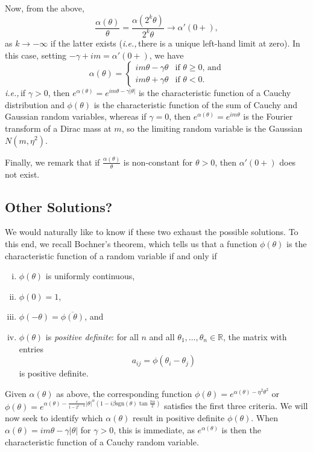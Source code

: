 \documentclass[11pt]{amsart}
\theoremstyle{remark}
\theoremstyle{definition}
\newcommand{\ie}{\textit{i.e.,}\,}
\begin{document}
Now, from the above, 
\[
	\frac{\alpha(\theta)}{\theta} = \frac{\alpha(2^{k} \theta)}{2^{k}\theta} \to \alpha'(0+),
\]
as $k \to - \infty$ if the latter exists (\ie there is a unique left-hand limit at zero).  In this case, setting $-\gamma + i m = \alpha'(0+)$, we have
\[
	\alpha(\theta) = \begin{cases} 
		i m\theta - \gamma \theta & \text{if $\theta \geq 0$, and}\\
		i m\theta + \gamma \theta & \text{if $\theta < 0$}.
	\end{cases}
\]
\ie if $\gamma > 0$, then $e^{\alpha(\theta)} = e^{im \theta -\gamma|\theta|}$ is the characteristic function of a Cauchy distribution and $\phi(\theta)$ is the characteristic function of the sum of Cauchy and Gaussian random variables, whereas if $\gamma = 0$, then $e^{\alpha(\theta)} = e^{im \theta}$ is the Fourier transform of a Dirac mass at $m$, so the limiting random variable is the Gaussian $N(m,\eta^{2})$. 

Finally, we remark that if $\frac{\alpha(\theta)}{\theta}$ is non-constant for $\theta > 0$, then $\alpha'(0+)$ does not exist. 

\subsection{Other Solutions?}

We would naturally like to know if these two exhaust the possible solutions.  To this end, we recall Bochner's theorem, which tells us that a function $\phi(\theta)$ is the characteristic function of a random variable if and only if
\begin{enumerate}[(i)]
\item $\phi(\theta)$ is uniformly continuous,
\item $\phi(0) = 1$,
\item $\phi(-\theta) = \overline{\phi(\theta)}$, and
\item $\phi(\theta)$ is \textit{positive definite}: for all $n$ and all $\theta_{1},\ldots,\theta_{n} \in \mathbb{R}$, the matrix with entries
\[
	a_{ij} = \phi(\theta_{i}-\theta_{j})
\]
is positive definite.
\end{enumerate}
Given $\alpha(\theta)$ as above, the corresponding function $\phi(\theta) = e^{\alpha(\theta)-\eta^{2}\theta^{2}}$ 
or $\phi(\theta) = e^{\alpha(\theta) - \frac{c}{1-2^{1-\alpha}}|\theta|^{\alpha}\left(1-i\beta \text{sgn}(\theta) \tan{\frac{\pi\alpha}{2}}\right)}$ satisfies the first three criteria.  We will now seek to identify which $\alpha(\theta)$ result in positive definite $\phi(\theta)$.  When $\alpha(\theta) = im \theta -\gamma|\theta|$ for $\gamma > 0$, this is immediate, as $e^{\alpha(\theta)}$ is then the characteristic function of a Cauchy random variable.
\end{document}
